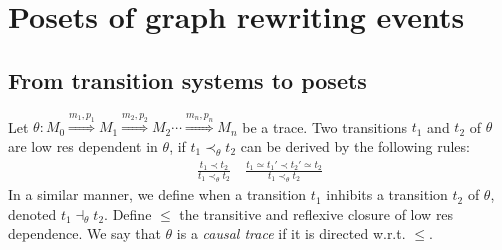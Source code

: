 \section{Posets of graph rewriting events}

\subsection{From transition systems to posets}
\label{sec:concret}

\begin{definition}
  \label{def:causal_trace}
  Let $\theta:M_0\overset{m_1,p_1}{\Rightarrow} M_1\overset{m_2,p_2}{\Rightarrow} M_2 \cdots \overset{m_n,p_n}{\Rightarrow} M_n$ be a trace.
  Two transitions $t_1$ and $t_2$ of $\theta$ are low res dependent in $\theta$, if $t_1\prec_{\theta} t_2$ can be derived by the following rules:
  \begin{align*}
    \frac{t_1 \prec t_2}{t_1 \prec_{\theta} t_2}\quad
    \frac{t_1\simeq t_1'\prec t_2'\simeq t_2}{t_1 \prec_{\theta} t_2}
  \end{align*}
  In a similar manner, we define when a transition $t_1$ inhibits a transition $t_2$ of $\theta$, denoted $t_1\dashv_{\theta} t_2$.
  Define $\leq$ the transitive and reflexive closure of low res dependence. We say that $\theta$ is a \emph{causal trace} if it is directed w.r.t. $\leq$.
\end{definition}

